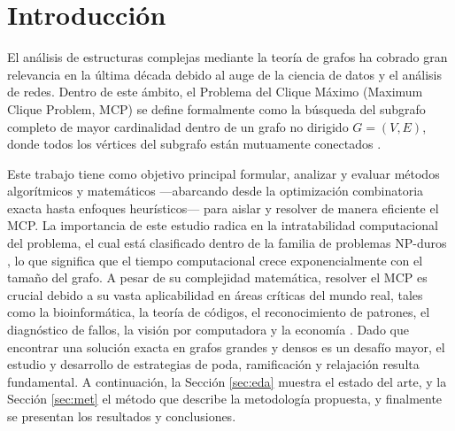 \section{Introducción}
El análisis de estructuras complejas mediante la teoría de grafos ha cobrado gran relevancia en la última década debido al auge de la ciencia de datos y el análisis de redes. Dentro de este ámbito, el Problema del Clique Máximo (Maximum Clique Problem, MCP) se define formalmente como la búsqueda del subgrafo completo de mayor cardinalidad dentro de un grafo no dirigido $G = (V, E)$, donde todos los vértices del subgrafo están mutuamente conectados \cite{pardalos1992_maxclique}.

Este trabajo tiene como objetivo principal formular, analizar y evaluar métodos algorítmicos y matemáticos —abarcando desde la optimización combinatoria exacta hasta enfoques heurísticos— para aislar y resolver de manera eficiente el MCP. La importancia de este estudio radica en la intratabilidad computacional del problema, el cual está clasificado dentro de la familia de problemas NP-duros \cite{szabo2018_different, akbari_polynomial}, lo que significa que el tiempo computacional crece exponencialmente con el tamaño del grafo. A pesar de su complejidad matemática, resolver el MCP es crucial debido a su vasta aplicabilidad en áreas críticas del mundo real, tales como la bioinformática, la teoría de códigos, el reconocimiento de patrones, el diagnóstico de fallos, la visión por computadora y la economía \cite{singh2014_simple, pardalos1992_maxclique}. Dado que encontrar una solución exacta en grafos grandes y densos es un desafío mayor, el estudio y desarrollo de estrategias de poda, ramificación y relajación resulta fundamental. A continuación, la Sección \ref{sec:eda} muestra el estado del arte, y la Sección \ref{sec:met} el método que describe la metodología propuesta, y finalmente se presentan los resultados y conclusiones.